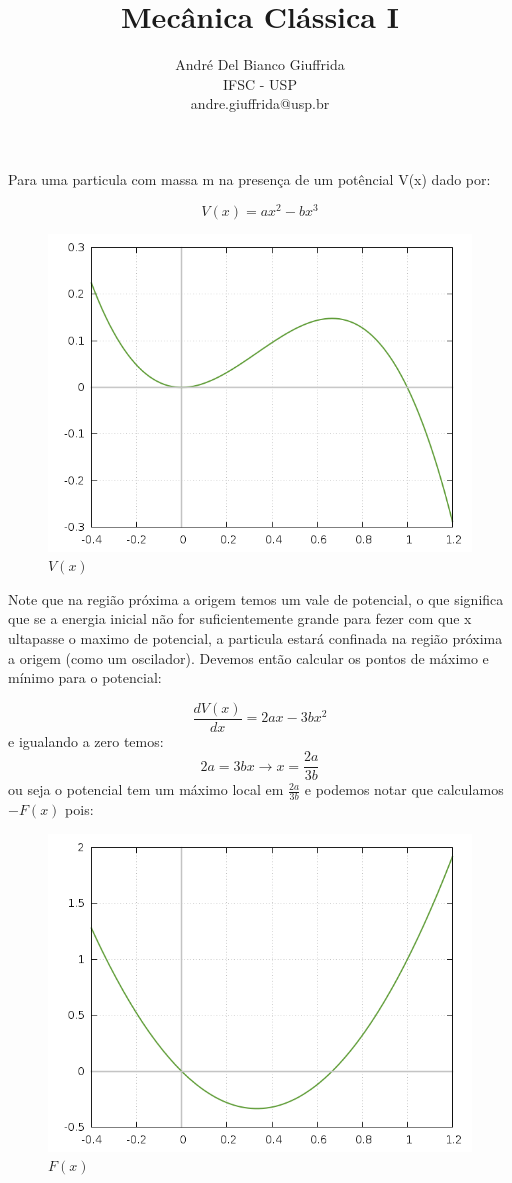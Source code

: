 \documentclass[a4paper,12pt]{article}
\title{ Mecânica Clássica I}
\author{\small André Del Bianco Giuffrida\\ \small IFSC - USP\\ \small andre.giuffrida@usp.br}
\date{}
\begin{document}
\maketitle
	Para uma particula com massa m na presença de um potêncial V(x) dado por:
	
		
		\[ V(x)= ax^2 -bx^3\]
		
		\begin{figure}[h]
			\centering
			\includegraphics[scale=0.6]{5o0.png}
			\caption{$V(x)$}
		\end{figure}

	Note que na região próxima a origem temos um vale de potencial, o que significa que se a energia inicial não for suficientemente grande para fezer com que x ultapasse o maximo de potencial, a particula estará confinada na região próxima a origem (como um oscilador).
	Devemos então calcular os pontos de máximo e mínimo para o potencial:
	
	\[ \frac{dV(x)}{dx} = 2ax -3bx^2 \]
	e igualando a zero temos:
	\[ 2a = 3bx  \to x=\frac{2a}{3b}  \]
	ou seja o potencial tem um máximo local em $\frac{2a}{3b}$ e podemos notar que calculamos $-F(x)$ pois:
	
	\begin{figure}[h]
			\centering
			\includegraphics[scale=0.6]{5o1.png}
			\caption{$F(x)$}
		\end{figure}
	
\end{document}
